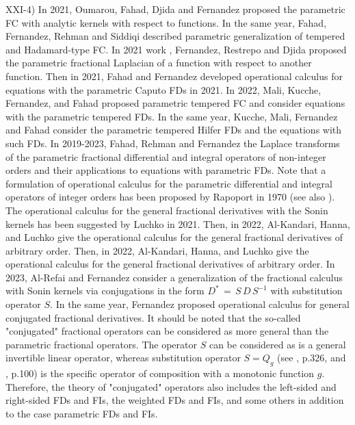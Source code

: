 \documentclass[12pt]{article}
\begin{document}
XXI-4) In 2021, Oumarou, Fahad, Djida and Fernandez \cite{Fernandez-1} proposed the parametric FC with analytic kernels with respect to functions.
In the same year, Fahad, Fernandez, Rehman and Siddiqi \cite{Fernandez-2} described parametric generalization of tempered and Hadamard-type FC.
In 2021 work \cite{Fernandez-3}, Fernandez, Restrepo and Djida proposed the parametric fractional Laplacian of a function with respect to another function.
Then in 2021, Fahad and Fernandez \cite{Fernandez-4} developed
operational calculus for equations with the parametric Caputo FDs in 2021.
In 2022, Mali, Kucche, Fernandez, and Fahad \cite{Fernandez-5}
proposed parametric tempered FC and consider equations with 
the parametric tempered FDs.
In the same year, Kucche, Mali, Fernandez and Fahad \cite{Fernandez-6} consider the parametric tempered Hilfer FDs and the equations with such FDs.
In 2019-2023, Fahad, Rehman and Fernandez \cite{Fernandez-7} 
the Laplace transforms of 
the parametric fractional differential and integral operators of non-integer orders
and their applications to equations with parametric FDs.
Note that a formulation of operational calculus for 
the parametric differential and integral operators of integer orders has been proposed by Rapoport \cite{Rapoport} in 1970 
(see also \cite{Brychkov-1,Brychkov-2}). 
The operational calculus for the general fractional derivatives with the Sonin kernels has been suggested 
by Luchko \cite{Luchko2021-3} in 2021. 
Then, in 2022, Al-Kandari, Hanna, and Luchko \cite{Luchko2022-4} give the operational calculus 
for the general fractional derivatives of arbitrary order.
Then, in 2022, Al-Kandari, Hanna, and Luchko \cite{Luchko2022-4} give the operational calculus for the general fractional derivatives of arbitrary order. 
In 2023, Al-Refai and Fernandez 
\cite{Fernandez-2023} consider a generalization of the fractional calculus with Sonin kernels via conjugations in the form $D^{*} \, = \, S \, D \, S^{-1}$ with substitution operator $S$. 
In the same year, Fernandez \cite{Fernandez-2023-NEW} proposed
operational calculus for general conjugated fractional derivatives. 
It should be noted that the so-called "conjugated" fractional operators can be considered as more general than the parametric fractional operators. 
The operator $S$ can be considered as is a general invertible linear operator, whereas substitution operator $S=Q_g$ (see \cite{SKM}, p.326, and \cite{KST}, p.100) is the specific operator of composition with a monotonic function $g$. Therefore, the theory of "conjugated" operators also includes the left-sided and right-sided FDs and FIs, the weighted FDs and FIs, and some others in addition to the case parametric FDs and FIs.
 
\end{document}

